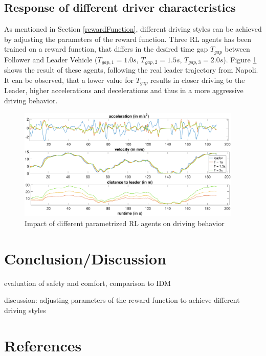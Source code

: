 \documentclass[review]{elsarticle}
\begin{document}
\subsection{Response of different driver characteristics}
\label{sec:differentT}

As mentioned in Section \ref{rewardFunction}, different driving styles can be achieved by adjusting the parameters of the reward function. Three RL agents has been trained on a reward function, that differs in the desired time gap $T_{gap}$ between Follower and Leader Vehicle ($T_{gap,1} = 1.0s$, $T_{gap,2} = 1.5s$, $T_{gap,3} = 2.0s$). Figure \ref{fig:differentT} shows the result of these agents, following the real leader trajectory from Napoli. It can be observed, that a lower value for $T_{gap}$ results in closer driving to the Leader, higher accelerations and decelerations and thus in a more aggressive driving behavior. 

\begin{figure}
	\centering
	\includegraphics[width=0.95\textwidth]{images/differentT}
	\caption{Impact of different parametrized RL agents on driving behavior}
	\label{fig:differentT}
\end{figure}


\section{Conclusion/Discussion}
evaluation of safety and comfort, comparison to IDM

discussion: adjusting parameters of the reward function to achieve different driving styles

\section*{References}


\end{document}
